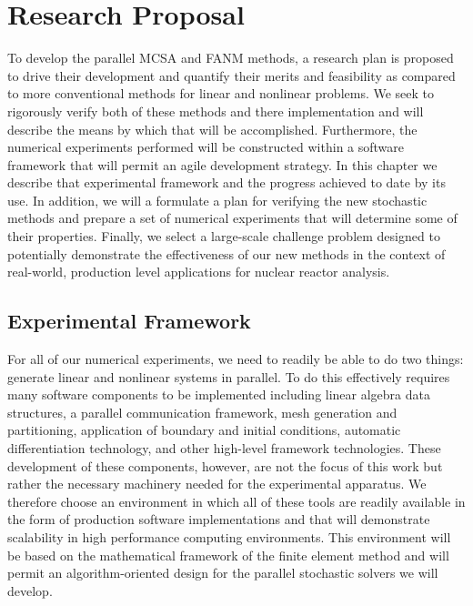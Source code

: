 \chapter{Research Proposal}
\label{ch:research_proposal}
To develop the parallel MCSA and FANM methods, a research plan is
proposed to drive their development and quantify their merits and
feasibility as compared to more conventional methods for linear and
nonlinear problems. We seek to rigorously verify both of these methods
and there implementation and will describe the means by which that
will be accomplished. Furthermore, the numerical experiments performed
will be constructed within a software framework that will permit an
agile development strategy. In this chapter we describe that
experimental framework and the progress achieved to date by its
use. In addition, we will a formulate a plan for verifying the new
stochastic methods and prepare a set of numerical experiments that
will determine some of their properties. Finally, we select a
large-scale challenge problem designed to potentially demonstrate the
effectiveness of our new methods in the context of real-world,
production level applications for nuclear reactor analysis.

\section{Experimental Framework}
\label{sec:experimental_framework}
For all of our numerical experiments, we need to readily be able to do
two things: generate linear and nonlinear systems in parallel. To do
this effectively requires many software components to be implemented
including linear algebra data structures, a parallel communication
framework, mesh generation and partitioning, application of boundary
and initial conditions, automatic differentiation technology, and
other high-level framework technologies. These development of these
components, however, are not the focus of this work but rather the
necessary machinery needed for the experimental apparatus. We
therefore choose an environment in which all of these tools are
readily available in the form of production software implementations
and that will demonstrate scalability in high performance computing
environments. This environment will be based on the mathematical
framework of the finite element method and will permit an
algorithm-oriented design for the parallel stochastic solvers we will
develop.


